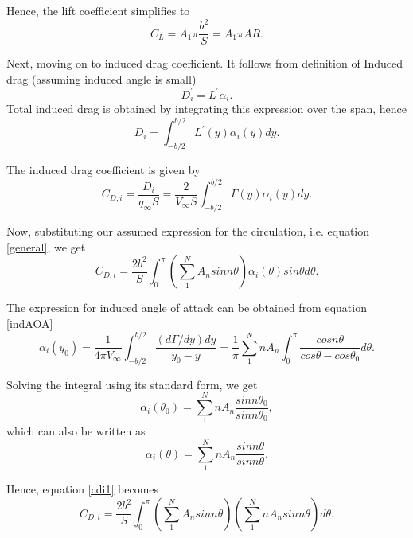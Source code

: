 \documentclass[letterpaper,12pt]{article}
\begin{document}
Hence, the lift coefficient simplifies to
\begin{equation}
C_L = A_1\pi\frac{b^2}{S} = A_1\pi AR.
\label{CoeffL}
\end{equation}

Next, moving on to induced drag coefficient. It follows from definition of Induced drag (assuming induced angle is small)
\begin{equation}
D_i^{'} = L^{'}\alpha_i.
\end{equation}
Total induced drag is obtained by integrating this expression over the span, hence
\begin{equation}
D_i = \int_{-b/2}^{b/2}L^{'}(y)\alpha_i(y)dy.
\end{equation}

The induced drag coefficient is given by
\begin{equation}
C_{D,i} = \frac{D_i}{q_\infty S} = \frac{2}{V_\infty S}\int_{-b/2}^{b/2}\Gamma(y)\alpha_i(y)dy.
\end{equation}

Now, substituting our assumed expression for the circulation, i.e. equation \ref{general}, we get
\begin{equation}
C_{D,i} = \frac{2b^2}{S}\int_0^\pi\left(\sum_1^NA_nsinn\theta\right)\alpha_i(\theta)sin\theta d\theta.
\label{cdi1}
\end{equation}

The expression for induced angle of attack can be obtained from equation \ref{indAOA}
\begin{equation}
\alpha_i(y_0) = \frac{1}{4\pi V_\infty}\int_{-b/2}^{b/2}\frac{(d\Gamma/dy)dy}{y_0-y} = \frac{1}{\pi}\sum_1^NnA_n\int_0^\pi\frac{cosn\theta}{cos\theta-cos\theta_0}d\theta.
\end{equation}

Solving the integral using its standard form, we get
\begin{equation}
\alpha_i(\theta_0) = \sum_1^NnA_n\frac{sinn\theta_0}{sinn\theta_0},
\end{equation}
which can also be written as
\begin{equation}
\alpha_i(\theta) = \sum_1^NnA_n\frac{sinn\theta}{sinn\theta}.
\end{equation}

Hence, equation \ref{cdi1} becomes
\begin{equation}
C_{D,i} = \frac{2b^2}{S}\int_0^\pi\left(\sum_1^NA_nsinn\theta\right)\left(\sum_1^NnA_nsinn\theta\right)d\theta.
\label{cdi2}
\end{equation}
\end{document}

